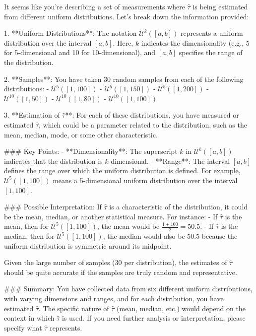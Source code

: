 It seems like you're describing a set of measurements where \(\hat{\tau}\) is being estimated from different uniform distributions. Let's break down the information provided:

1. **Uniform Distributions**: The notation \(\mathcal{U}^k([a, b])\) represents a uniform distribution over the interval \([a, b]\). Here, \(k\) indicates the dimensionality (e.g., 5 for 5-dimensional and 10 for 10-dimensional), and \([a, b]\) specifies the range of the distribution.

2. **Samples**: You have taken 30 random samples from each of the following distributions:
   - \(\mathcal{U}^5([1, 100])\)
   - \(\mathcal{U}^5([1, 150])\)
   - \(\mathcal{U}^5([1, 200])\)
   - \(\mathcal{U}^{10}([1, 50])\)
   - \(\mathcal{U}^{10}([1, 80])\)
   - \(\mathcal{U}^{10}([1, 100])\)

3. **Estimation of \(\hat{\tau}\)**: For each of these distributions, you have measured or estimated \(\hat{\tau}\), which could be a parameter related to the distribution, such as the mean, median, mode, or some other characteristic.

### Key Points:
- **Dimensionality**: The superscript \(k\) in \(\mathcal{U}^k([a, b])\) indicates that the distribution is \(k\)-dimensional.
- **Range**: The interval \([a, b]\) defines the range over which the uniform distribution is defined. For example, \(\mathcal{U}^5([1, 100])\) means a 5-dimensional uniform distribution over the interval \([1, 100]\).

### Possible Interpretation:
If \(\hat{\tau}\) is a characteristic of the distribution, it could be the mean, median, or another statistical measure. For instance:
- If \(\hat{\tau}\) is the mean, then for \(\mathcal{U}^5([1, 100])\), the mean would be \(\frac{1 + 100}{2} = 50.5\).
- If \(\hat{\tau}\) is the median, then for \(\mathcal{U}^5([1, 100])\), the median would also be 50.5 because the uniform distribution is symmetric around its midpoint.

Given the large number of samples (30 per distribution), the estimates of \(\hat{\tau}\) should be quite accurate if the samples are truly random and representative.

### Summary:
You have collected data from six different uniform distributions, with varying dimensions and ranges, and for each distribution, you have estimated \(\hat{\tau}\). The specific nature of \(\hat{\tau}\) (mean, median, etc.) would depend on the context in which \(\hat{\tau}\) is used. If you need further analysis or interpretation, please specify what \(\hat{\tau}\) represents.